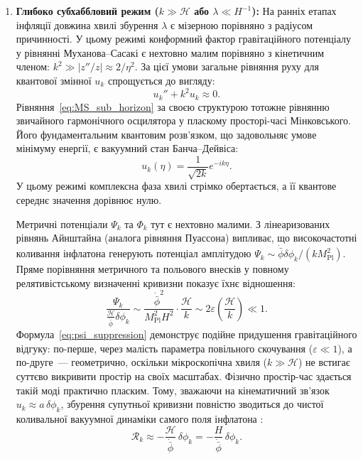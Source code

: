 \begin{enumerate}
\item \textbf{Глибоко субхаббловий режим ($k \gg \mathcal{H}$ або $\lambda \ll H^{-1}$):}
  На ранніх етапах інфляції довжина хвилі збурення $\lambda$ є мізерною порівняно з радіусом причинності. У цьому режимі конформний фактор гравітаційного потенціалу у рівнянні Муханова--Сасакі є нехтовно малим порівняно з кінетичним членом: $k^2 \gg |z''/z| \approx 2/\eta^2$. За цієї умови загальне рівняння руху для квантової змінної $u_k$ спрощується до вигляду:
  \begin{equation}\label{eq:MS_sub_horizon}
    u_k'' + k^2 u_k \approx 0.
  \end{equation}
  Рівняння~\eqref{eq:MS_sub_horizon} за своєю структурою тотожне рівнянню звичайного гармонічного осцилятора у пласкому просторі-часі Мінковського. Його фундаментальним квантовим розв'язком, що задовольняє умове мінімуму енергії, є вакуумний стан Банча--Дейвіса:
  \begin{equation}\label{eq:bunch_davies}
    u_k(\eta) = \frac{1}{\sqrt{2k}} e^{-ik\eta}.
  \end{equation}
  У цьому режимі комплексна фаза хвилі стрімко обертається, а її квантове середнє значення дорівнює нулю.

  Метричні потенціали $\Psi_k$ та $\Phi_k$ тут є нехтовно малими. З лінеаризованих рівнянь Айнштайна (аналога рівняння Пуассона) випливає, що високочастотні коливання інфлатона генерують потенціал амплітудою $\Psi_k \sim \dot{\bar{\phi}}\delta\phi_k / (k M_{\mathrm{Pl}}^2)$. Пряме порівняння метричного та польового внесків у повному релятивістському визначенні кривизни показує їхнє відношення:
  \begin{equation}\label{eq:psi_suppression}
    \frac{\Psi_k}{\frac{\mathcal{H}}{\dot{\bar{\phi}}}\delta\phi_k} \sim \frac{\dot{\bar{\phi}}^2}{M_{\mathrm{Pl}}^2 H^2} \cdot \frac{\mathcal{H}}{k} \sim 2\varepsilon \left(\frac{\mathcal{H}}{k}\right) \ll 1.
  \end{equation}
  Формула~\eqref{eq:psi_suppression} демонструє подійне придушення гравітаційного відгуку: по-перше, через малість параметра повільного скочування ($\varepsilon \ll 1$), а по-друге~--- геометрично, оскільки мікроскопічна хвиля ($k \gg \mathcal{H}$) не встигає суттєво викривити простір на своїх масштабах. Фізично простір-час здається такій моді практично пласким. Тому, зважаючи на кінематичний зв'язок $u_k \approx a\,\delta\phi_k$, збурення супутньої кривизни повністю зводиться до чистої коливальної вакуумної динаміки самого поля інфлатона \cite{mukhanov_2005}:
  \begin{equation}\label{eq:curvature_perturbation_sub}
    \mathcal{R}_k \approx -\frac{\mathcal{H}}{\dot{\bar{\phi}}}\,\delta\phi_k = -\frac{H}{\dot{\bar{\phi}}}\,\delta\phi_k.
  \end{equation}


\end{enumerate}
